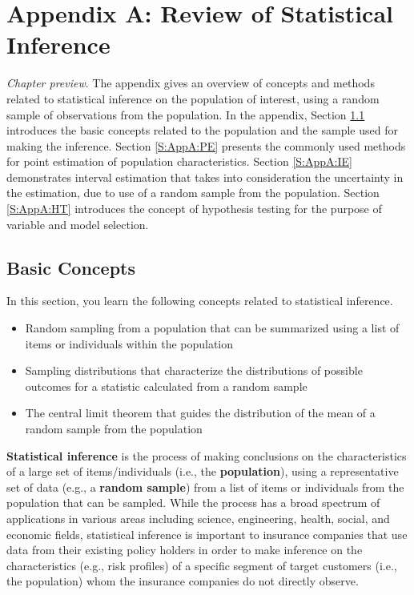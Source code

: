 \documentclass[]{book}
\providecommand{\tightlist}{%
  \setlength{\itemsep}{0pt}\setlength{\parskip}{0pt}}
\theoremstyle{definition}
\theoremstyle{definition}
\theoremstyle{definition}
\theoremstyle{remark}
\begin{document}
\chapter{Appendix A: Review of Statistical Inference}\label{C:AppA}

\emph{Chapter preview}. The appendix gives an overview of concepts and
methods related to statistical inference on the population of interest,
using a random sample of observations from the population. In the
appendix, Section \ref{S:AppA:BASIC} introduces the basic concepts
related to the population and the sample used for making the inference.
Section \ref{S:AppA:PE} presents the commonly used methods for point
estimation of population characteristics. Section \ref{S:AppA:IE}
demonstrates interval estimation that takes into consideration the
uncertainty in the estimation, due to use of a random sample from the
population. Section \ref{S:AppA:HT} introduces the concept of hypothesis
testing for the purpose of variable and model selection.

\section{Basic Concepts}\label{S:AppA:BASIC}

In this section, you learn the following concepts related to statistical
inference.

\begin{itemize}
\tightlist
\item
  Random sampling from a population that can be summarized using a list
  of items or individuals within the population
\item
  Sampling distributions that characterize the distributions of possible
  outcomes for a statistic calculated from a random sample
\item
  The central limit theorem that guides the distribution of the mean of
  a random sample from the population
\end{itemize}

\textbf{Statistical inference} is the process of making conclusions on
the characteristics of a large set of items/individuals (i.e., the
\textbf{population}), using a representative set of data (e.g., a
\textbf{random sample}) from a list of items or individuals from the
population that can be sampled. While the process has a broad spectrum
of applications in various areas including science, engineering, health,
social, and economic fields, statistical inference is important to
insurance companies that use data from their existing policy holders in
order to make inference on the characteristics (e.g., risk profiles) of
a specific segment of target customers (i.e., the population) whom the
insurance companies do not directly observe.
\end{document}
